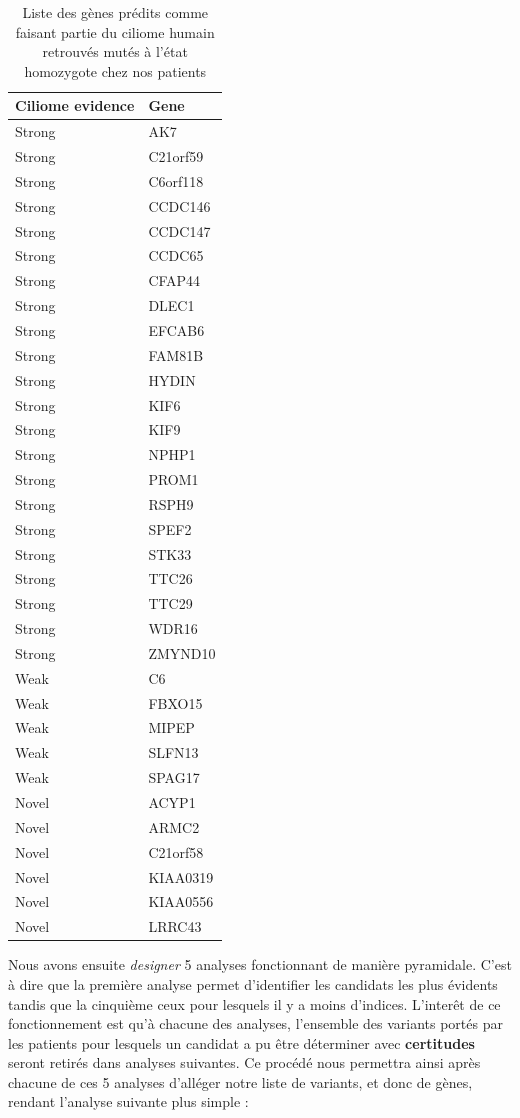 \documentclass[12pt,twoside]{reedthesis}
\theoremstyle{definition}
\theoremstyle{definition}
\theoremstyle{remark}
\begin{document}
  \begin{longtable}[t]{ll}
  \caption{\label{tab:tabcil}Liste des gènes prédits comme faisant partie du ciliome humain retrouvés mutés à l'état homozygote chez nos patients}\\
  \toprule
  Ciliome evidence & Gene\\
  \midrule
  Strong & AK7\\
  Strong & C21orf59\\
  Strong & C6orf118\\
  Strong & CCDC146\\
  Strong & CCDC147\\
  \addlinespace
  Strong & CCDC65\\
  Strong & CFAP44\\
  Strong & DLEC1\\
  Strong & EFCAB6\\
  Strong & FAM81B\\
  \addlinespace
  Strong & HYDIN\\
  Strong & KIF6\\
  Strong & KIF9\\
  Strong & NPHP1\\
  Strong & PROM1\\
  \addlinespace
  Strong & RSPH9\\
  Strong & SPEF2\\
  Strong & STK33\\
  Strong & TTC26\\
  Strong & TTC29\\
  \addlinespace
  Strong & WDR16\\
  Strong & ZMYND10\\
  Weak & C6\\
  Weak & FBXO15\\
  Weak & MIPEP\\
  \addlinespace
  Weak & SLFN13\\
  Weak & SPAG17\\
  Novel & ACYP1\\
  Novel & ARMC2\\
  Novel & C21orf58\\
  \addlinespace
  Novel & KIAA0319\\
  Novel & KIAA0556\\
  Novel & LRRC43\\
  \bottomrule
  \end{longtable}
  
  \newpage
  
  Nous avons ensuite \emph{designer} 5 analyses fonctionnant de manière
  pyramidale. C'est à dire que la première analyse permet d'identifier les
  candidats les plus évidents tandis que la cinquième ceux pour lesquels
  il y a moins d'indices. L'interêt de ce fonctionnement est qu'à chacune
  des analyses, l'ensemble des variants portés par les patients pour
  lesquels un candidat a pu être déterminer avec \textbf{certitudes}
  seront retirés dans analyses suivantes. Ce procédé nous permettra ainsi
  après chacune de ces 5 analyses d'alléger notre liste de variants, et
  donc de gènes, rendant l'analyse suivante plus simple :
  
\end{document}
